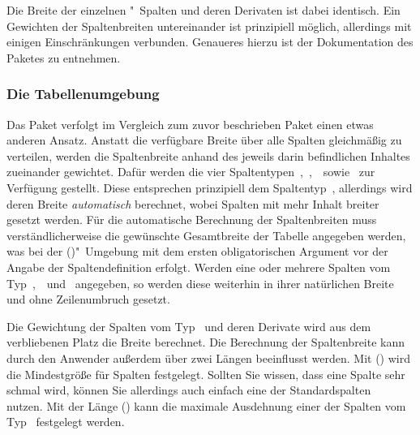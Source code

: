 \documentclass[%
  english,ngerman,%
  cdgeometry=no,DIV=12,automark%
]{tudscrartcl}
\begin{document}
\InputCode\noindent
%
Die Breite der einzelnen "~Spalten und deren Derivaten ist dabei 
identisch. Ein Gewichten der Spaltenbreiten untereinander ist prinzipiell 
möglich, allerdings mit einigen Einschränkungen verbunden. Genaueres hierzu ist 
der Dokumentation des Paketes  zu entnehmen.

\subsubsection{Die Tabellenumgebung }
\label{sec:tabulary}%
%
Das Paket  verfolgt im Vergleich zum zuvor beschrieben Paket 
 einen etwas anderen Ansatz. Anstatt die verfügbare Breite 
über alle Spalten gleichmäßig zu verteilen, werden die Spaltenbreite anhand des 
jeweils darin befindlichen Inhaltes zueinander gewichtet. Dafür werden die vier 
Spaltentypen~,~,~~sowie~ zur Verfügung 
gestellt. Diese entsprechen prinzipiell dem Spaltentyp~, allerdings 
wird deren Breite \emph{automatisch} berechnet, wobei Spalten mit mehr Inhalt 
breiter gesetzt werden. Für die automatische Berechnung der Spaltenbreiten muss 
verständlicherweise die gewünschte Gesamtbreite der Tabelle angegeben werden, 
was bei der ()"~Umgebung mit dem ersten 
obligatorischen Argument vor der Angabe der Spaltendefinition erfolgt. Werden 
eine oder mehrere Spalten vom Typ~,~~und~ 
angegeben, so werden diese weiterhin in ihrer natürlichen Breite und ohne 
Zeilenumbruch gesetzt. 

Die Gewichtung der Spalten vom Typ~ und deren Derivate wird aus 
dem verbliebenen Platz die Breite berechnet. Die Berechnung der Spaltenbreite 
kann durch den Anwender außerdem über zwei Längen beeinflusst werden. Mit 
() wird die Mindestgröße für Spalten 
festgelegt. Sollten Sie wissen, dass eine Spalte sehr schmal wird, können Sie 
allerdings auch einfach eine der Standardspalten~ nutzen. Mit der 
Länge () kann die maximale Ausdehnung einer der 
Spalten vom Typ~ festgelegt werden. 
\end{document}
